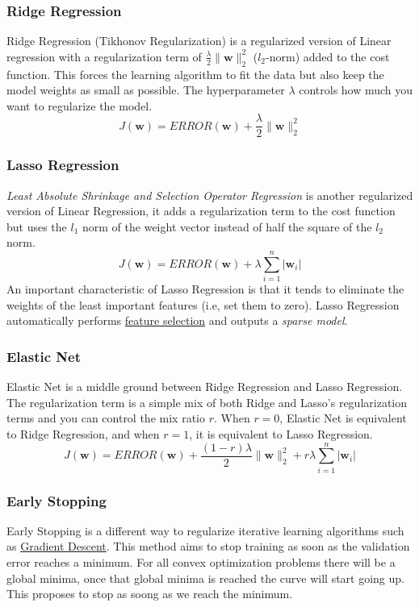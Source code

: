 \documentclass[12pt]{article}
\begin{document}
        \subsubsection{Ridge Regression} \label{sec:RidgeReg} Ridge Regression (Tikhonov Regularization) is a
            regularized version of Linear regression with a regularization term of
            $\frac{\lambda}{2}\|\boldsymbol{w}\|_2^2$ ($l_2$-norm) added to the cost function. This forces the learning
            algorithm to fit the data but also keep the model weights as small as possible. The hyperparameter $\lambda$
            controls how much you want to regularize the model.
            $$ J(\boldsymbol{w}) = ERROR(\boldsymbol{w}) + \frac{\lambda}{2}\|\boldsymbol{w}\|^2_2 $$

        \subsubsection{Lasso Regression}
            \textit{Least Absolute Shrinkage and Selection Operator Regression} is another regularized version of Linear
            Regression, it adds a regularization term to the cost function but uses the $l_1$ norm of the weight vector
            instead of half the square of the $l_2$ norm.
            $$ J(\boldsymbol{w}) = ERROR(\boldsymbol{w}) + \lambda\sum_{i=1}^n|\boldsymbol{w}_i| $$ An important
            characteristic of Lasso Regression is that it tends to eliminate the weights of the least important features
            (i.e, set them to zero). Lasso Regression automatically performs \hyperref[sec:FeatureSelection]{feature
            selection} and outputs a \textit{sparse model}.

        \subsubsection{Elastic Net}
            Elastic Net is a middle ground between Ridge Regression and Lasso Regression. The regularization term is a
            simple mix of both Ridge and Lasso's regularization terms and you can control the mix ratio $r$. When $r =
            0$, Elastic Net is equivalent to Ridge Regression, and when $r = 1$, it is equivalent to Lasso Regression.
            $$ J(\boldsymbol{w}) = ERROR(\boldsymbol{w}) + \frac{(1-r)\lambda}{2}\|\boldsymbol{w}\|^2_2 +
            r\lambda\sum_{i=1}^n|\boldsymbol{w}_i| $$
        
        \subsubsection{Early Stopping}
            Early Stopping is a different way to regularize iterative learning algorithms such as
            \hyperref[sec:GD]{Gradient Descent}. This method aims to stop training as soon as the validation error
            reaches a minimum. For all convex optimization problems there will be a global minima, once that global
            minima is reached the curve will start going up. This proposes to stop as soong as we reach the minimum.
\end{document}
